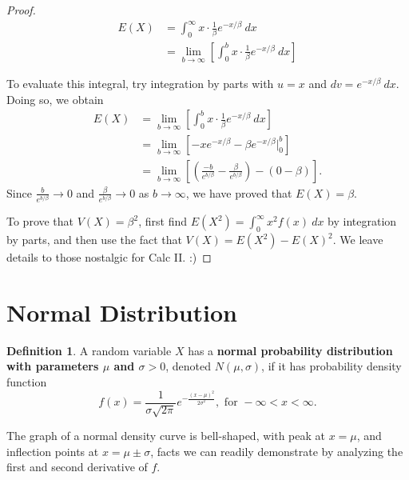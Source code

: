 \documentclass[
]{book}
\theoremstyle{definition}
\newtheorem{definition}{Definition}[chapter]
\theoremstyle{definition}
\theoremstyle{definition}
\theoremstyle{definition}
\theoremstyle{remark}
\begin{document}
\begin{proof}
\begin{align*}
E(X)&= \int_0^\infty x\cdot\frac{1}{\beta} e^{-x/\beta}~dx \\
    &= \lim_{b \to \infty}\left[\int_0^b x\cdot\frac{1}{\beta} e^{-x/\beta}~dx\right]
\end{align*}

To evaluate this integral, try integration by parts with \(u = x\) and \(dv = e^{-x/\beta}~dx\). Doing so, we obtain
\begin{align*}
E(X) &= \lim_{b \to \infty}\left[\int_0^b x\cdot\frac{1}{\beta} e^{-x/\beta}~dx\right]\\
    &= \lim_{b \to \infty}\left[-xe^{-x/\beta} - \beta e^{-x/\beta}\biggr|_0^b\right]\\
    &= \lim_{b \to \infty}\left[\left(\frac{-b}{e^{b/\beta}} - \frac{\beta}{e^{b/\beta}}\right) - \left(0 - \beta\right)\right].
\end{align*}
Since \(\displaystyle \frac{b}{e^{b/\beta}} \to 0\) and \(\displaystyle \frac{\beta}{e^{b/\beta}} \to 0\) as \(b \to \infty\), we have proved that \(E(X) = \beta.\)

To prove that \(V(X) = \beta^2\), first find \(E(X^2)=\int_0^\infty x^2 f(x)~dx\) by integration by parts, and then use the fact that \(V(X) = E(X^2)-E(X)^2\). We leave details to those nostalgic for Calc II. :)
\end{proof}

\section{Normal Distribution}\label{normal}

\begin{definition}
\protect\hypertarget{def:normal-distribution}{}\label{def:normal-distribution}A random variable \(X\) has a \textbf{normal probability distribution with parameters \(\mu\) and \(\sigma > 0\)}, denoted \(N(\mu,\sigma)\), if it has probability density function
\[
f(x)=\frac{1}{\sigma\sqrt{2\pi}}e^{-\frac{(x-\mu)^2}{2\sigma^2}}, \text{ for } -\infty < x < \infty.
\]
\end{definition}

The graph of a normal density curve is bell-shaped, with peak at \(x = \mu\), and inflection points at \(x = \mu \pm \sigma\), facts we can readily demonstrate by analyzing the first and second derivative of \(f\).
\end{document}
